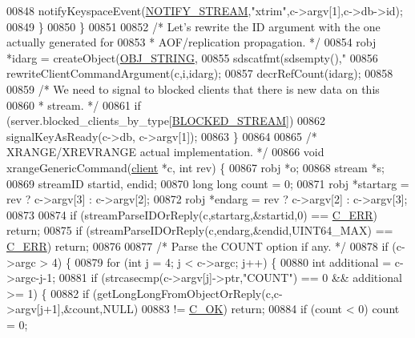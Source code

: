 \begin{DoxyCode}
{{{00848             notifyKeyspaceEvent(\hyperlink{server_8h_a045eabb1c5cc4dd02abfbfbae1d27c84}{NOTIFY\_STREAM},\textcolor{stringliteral}{"xtrim"},c->argv[1],c->db->id);
00849         \}
00850     \}
00851 
00852     \textcolor{comment}{/* Let's rewrite the ID argument with the one actually generated for}
00853 \textcolor{comment}{     * AOF/replication propagation. */}
00854     robj *idarg = createObject(\hyperlink{server_8h_a65236ea160f69cdef33ec942092af88f}{OBJ\_STRING},
00855                   sdscatfmt(sdsempty(),\textcolor{stringliteral}{"%
00856     rewriteClientCommandArgument(c,i,idarg);
00857     decrRefCount(idarg);
00858 
00859     \textcolor{comment}{/* We need to signal to blocked clients that there is new data on this}
00860 \textcolor{comment}{     * stream. */}
00861     \textcolor{keywordflow}{if} (server.blocked\_clients\_by\_type[\hyperlink{server_8h_a1f48bb63f9d0c061421044b92b46f679}{BLOCKED\_STREAM}])
00862         signalKeyAsReady(c->db, c->argv[1]);
00863 \}
00864 
00865 \textcolor{comment}{/* XRANGE/XREVRANGE actual implementation. */}
00866 \textcolor{keywordtype}{void} xrangeGenericCommand(\hyperlink{structclient}{client} *c, \textcolor{keywordtype}{int} rev) \{
00867     robj *o;
00868     stream *s;
00869     streamID startid, endid;
00870     \textcolor{keywordtype}{long} \textcolor{keywordtype}{long} count = 0;
00871     robj *startarg = rev ? c->argv[3] : c->argv[2];
00872     robj *endarg = rev ? c->argv[2] : c->argv[3];
00873 
00874     \textcolor{keywordflow}{if} (streamParseIDOrReply(c,startarg,&startid,0) == \hyperlink{server_8h_af98ac28d5f4d23d7ed5985188e6fb7d1}{C\_ERR}) \textcolor{keywordflow}{return};
00875     \textcolor{keywordflow}{if} (streamParseIDOrReply(c,endarg,&endid,UINT64\_MAX) == \hyperlink{server_8h_af98ac28d5f4d23d7ed5985188e6fb7d1}{C\_ERR}) \textcolor{keywordflow}{return};
00876 
00877     \textcolor{comment}{/* Parse the COUNT option if any. */}
00878     \textcolor{keywordflow}{if} (c->argc > 4) \{
00879         \textcolor{keywordflow}{for} (\textcolor{keywordtype}{int} j = 4; j < c->argc; j++) \{
00880             \textcolor{keywordtype}{int} additional = c->argc-j-1;
00881             \textcolor{keywordflow}{if} (strcasecmp(c->argv[j]->ptr,\textcolor{stringliteral}{"COUNT"}) == 0 && additional >= 1) \{
00882                 \textcolor{keywordflow}{if} (getLongLongFromObjectOrReply(c,c->argv[j+1],&count,NULL)
00883                     != \hyperlink{server_8h_a303769ef1065076e68731584e758d3e1}{C\_OK}) \textcolor{keywordflow}{return};
00884                 \textcolor{keywordflow}{if} (count < 0) count = 0;
}}}}
\end{DoxyCode}
